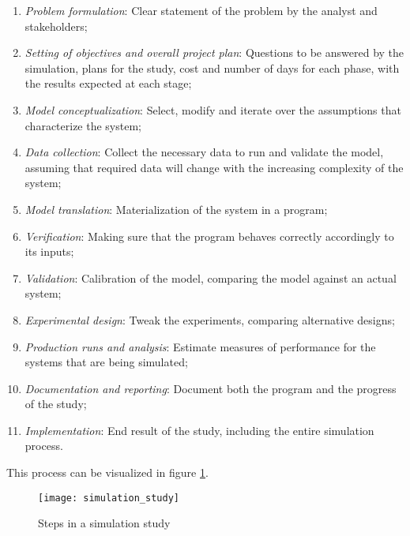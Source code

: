 \begin{enumerate}
    \item \textit{Problem formulation}: Clear statement of the problem by the 
    analyst and stakeholders; \label{enum:mform}
    \item \textit{Setting of objectives and overall project plan}: Questions to 
    be answered by the simulation, plans for the study, cost and number of days 
    for each phase, with the results expected at each stage; \label{enum:mobj}
    \item \textit{Model conceptualization}: Select, modify and iterate over the 
    assumptions that characterize the system; \label{enum:mconcept}
    \item \textit{Data collection}: Collect the necessary data to run and 
    validate the model, assuming that required data will change with the 
    increasing complexity of the system; \label{enum:mdata}
    \item \textit{Model translation}: Materialization of the system in a 
    program; \label{enum:mtransl}
    \item \textit{Verification}: Making sure that the program behaves correctly 
    accordingly to its inputs; \label{enum:mverif}
    \item \textit{Validation}: Calibration of the model, comparing the model 
    against an actual system; \label{enum:mvalid}
    \item \textit{Experimental design}: Tweak the experiments, comparing 
    alternative designs; \label{enum:mexp}
    \item \textit{Production runs and analysis}: Estimate measures of 
    performance for the systems that are being simulated; \label{enum:mprod}
    \item \textit{Documentation and reporting}: Document both the program and 
    the progress of the study; \label{enum:mdocs}
    \item \textit{Implementation}: End result of the study, including the 
    entire simulation process. \label{enum:mimpl}
\end{enumerate}

This process can be visualized in figure \ref{fig:sim}.

\begin{figure}[h]
    \begin{center}
        \leavevmode
        \texttt{[image: simulation\_study]}
        \caption{Steps in a simulation study \cite{Banks2004}}
        \label{fig:sim}
    \end{center}
\end{figure}

